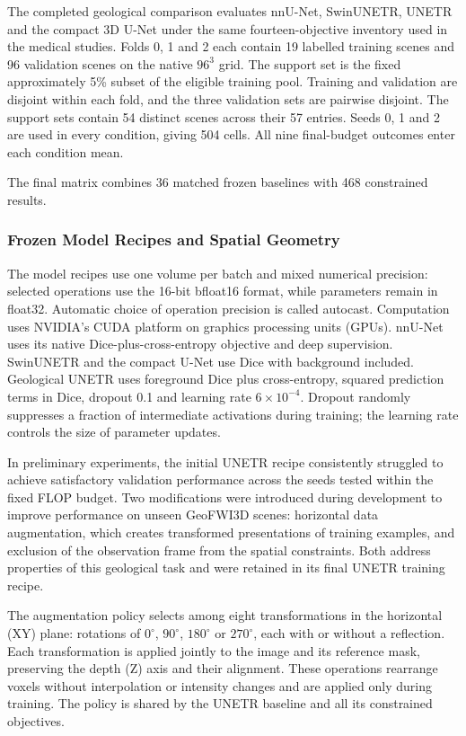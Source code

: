The completed geological comparison evaluates nnU-Net, SwinUNETR,
UNETR and the compact 3D U-Net under the same fourteen-objective
inventory used in the medical studies. Folds 0, 1 and 2 each contain
19 labelled training scenes and 96 validation scenes on the native
$96^3$ grid. The support set is the fixed approximately 5\% subset
of the eligible training pool. Training and validation are disjoint
within each fold, and the three validation sets are pairwise disjoint.
The support sets contain 54 distinct scenes across their 57 entries.
Seeds 0, 1 and 2 are used in every condition, giving 504 cells.
All nine final-budget outcomes enter each condition mean.

The final matrix combines 36 matched frozen baselines with 468
constrained results. 

\subsubsection{Frozen Model Recipes and Spatial Geometry}

The model recipes use one volume per batch and mixed numerical precision:
selected operations use the 16-bit bfloat16 format, while parameters remain
in float32. Automatic choice of operation precision is called autocast.
Computation uses NVIDIA's CUDA platform on graphics processing units (GPUs).
nnU-Net uses its native Dice-plus-cross-entropy objective and deep
supervision. SwinUNETR and the compact U-Net use Dice with background
included. Geological UNETR uses foreground Dice plus cross-entropy, squared
prediction terms in Dice, dropout 0.1 and learning rate $6\times10^{-4}$.
Dropout randomly suppresses a fraction of intermediate activations during
training; the learning rate controls the size of parameter updates.

In preliminary experiments, the initial UNETR recipe consistently struggled
to achieve satisfactory validation performance across the seeds tested
within the fixed FLOP budget. Two modifications were introduced during
development to improve performance on unseen GeoFWI3D scenes: horizontal
data augmentation, which creates transformed presentations of training
examples, and exclusion of the observation frame from the spatial
constraints. Both address properties of this geological task and were
retained in its final UNETR training recipe.

The augmentation policy selects among eight transformations in the
horizontal (XY) plane: rotations of $0^\circ$, $90^\circ$, $180^\circ$
or $270^\circ$, each with or without a reflection. Each transformation
is applied jointly to the image and its reference mask, preserving the
depth (Z) axis and their alignment. These operations rearrange voxels
without interpolation or intensity changes and are applied only during
training. The policy is shared by the UNETR baseline and all its
constrained objectives.

